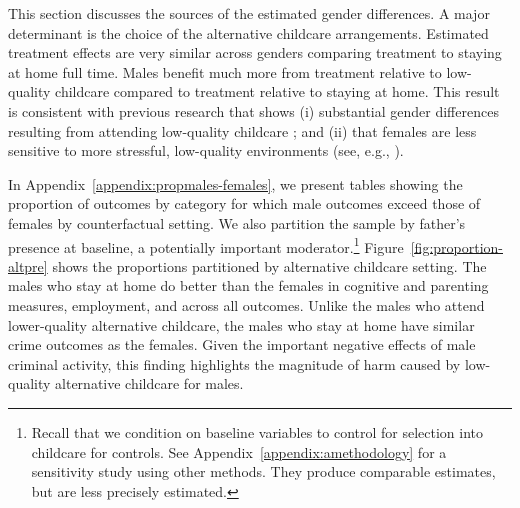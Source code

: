 This section discusses the sources of the estimated gender differences. A major determinant is the choice of the alternative childcare arrangements. Estimated treatment effects are very similar across genders comparing treatment to staying at home full time. Males benefit much more from treatment relative to low-quality childcare compared to treatment relative to staying at home. This result is consistent with previous research that shows (i) substantial gender differences resulting from attending low-quality childcare \citep{Kottelenberg_Lehrer_2014_Gender-Effects,Baker_Gruber_Milligan_2015_Noncog_Defects}; and (ii) that females are less sensitive to more stressful, low-quality environments (see, e.g., \citealp{Golding_Fitzgerald_2017_IMHJ,Autor-etal_2015_Family-Disadvantage}).

In Appendix~\ref{appendix:propmales-females}, we present tables showing the proportion of outcomes by category for which male outcomes exceed those of females by counterfactual setting. We also partition the sample by father's presence at baseline, a potentially important moderator.\footnote{Recall that we condition on baseline variables to control for selection into childcare for controls. See Appendix~\ref{appendix:amethodology} for a sensitivity study using other methods. They produce comparable estimates, but are less precisely estimated.} Figure~\ref{fig:proportion-altpre} shows the proportions partitioned by alternative childcare setting. The males who stay at home do better than the females in cognitive and parenting measures, employment, and across all outcomes. Unlike the males who attend lower-quality alternative childcare, the males who stay at home have similar crime outcomes as the females. Given the important negative effects of male criminal activity, this finding highlights the magnitude of harm caused by low-quality alternative childcare for males.

